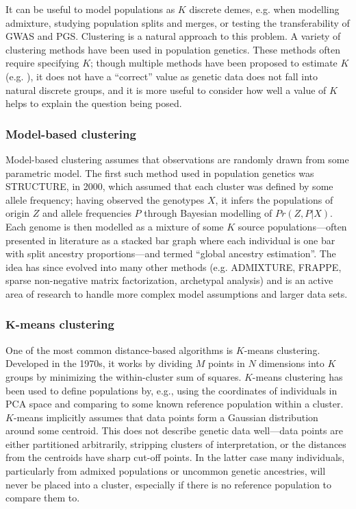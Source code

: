 It can be useful to model populations as $K$ discrete demes, e.g. when modelling admixture, studying population splits and merges, or testing the transferability of GWAS and PGS. Clustering is a natural approach to this problem. A variety of clustering methods have been used in population genetics. These methods often require specifying $K$; though multiple methods have been proposed to estimate $K$ (e.g. \citep{evanno_detecting_2005,verity_estimating_2016}), it does not have a ``correct'' value as genetic data does not fall into natural discrete groups, and it is more useful to  consider how well a value of $K$ helps to explain the question being posed\citep{lawson_tutorial_2018}.

\subsubsection{Model-based clustering}

Model-based clustering assumes that observations are randomly drawn from some parametric model. The first such method used in population genetics was STRUCTURE, in 2000, which assumed that each cluster was defined by some allele frequency; having observed the genotypes $X$, it infers the populations of origin $Z$ and allele frequencies $P$ through Bayesian modelling of $Pr(Z, P|X)$\citep{pritchard_inference_2000}. Each genome is then modelled as a mixture of some $K$ source populations---often presented in literature as a stacked bar graph where each individual is one bar with split ancestry proportions---and termed ``global ancestry estimation''\citep{alexander_fast_2009}. The idea has since evolved into many other methods (e.g. ADMIXTURE\citep{alexander_fast_2009}, FRAPPE\citep{tang_estimation_2005}, sparse non-negative matrix factorization\citep{frichot_fast_2014}, archetypal analysis\citep{gimbernat-mayol_archetypal_2022}) and is an active area of research to handle more complex model assumptions and larger data sets.

\subsubsection{\texorpdfstring{$\mathbf{K}$}{f}-means clustering}

One of the most common distance-based algorithms is $K$-means clustering. Developed in the 1970s, it works by dividing $M$ points in $N$ dimensions into $K$ groups by minimizing the within-cluster sum of squares\citep{hartigan_algorithm_1979}. $K$-means clustering has been used to define populations by, e.g., using the coordinates of individuals in PCA space and comparing to some known reference population within a cluster. $K$-means implicitly assumes that data points form a Gaussian distribution around some centroid\citep{mcinnes_accelerated_2017}. This does not describe genetic data well---data points are either partitioned arbitrarily, stripping clusters of interpretation, or the distances from the centroids have sharp cut-off points. In the latter case many individuals, particularly from admixed populations or uncommon genetic ancestries, will never be placed into a cluster, especially if there is no reference population to compare them to\citep{ding_polygenic_2023}.


